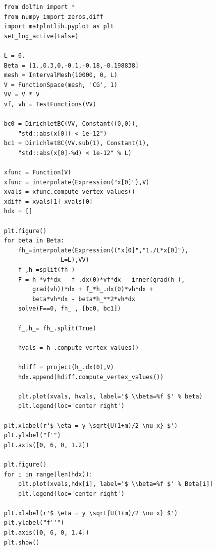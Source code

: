 \documentclass[a4paper,english,11pt,twoside]{article}
\begin{document}
\begin{lstlisting}[style=python]
from dolfin import *
from numpy import zeros,diff
import matplotlib.pyplot as plt
set_log_active(False)

L = 6.
Beta = [1.,0.3,0,-0.1,-0.18,-0.198838]
mesh = IntervalMesh(10000, 0, L)
V = FunctionSpace(mesh, 'CG', 1)
VV = V * V
vf, vh = TestFunctions(VV)

bc0 = DirichletBC(VV, Constant((0,0)), 
	"std::abs(x[0]) < 1e-12")
bc1 = DirichletBC(VV.sub(1), Constant(1), 
	"std::abs(x[0]-%d) < 1e-12" % L)

xfunc = Function(V)
xfunc = interpolate(Expression("x[0]"),V)
xvals = xfunc.compute_vertex_values()
xdiff = xvals[1]-xvals[0]
hdx = []

plt.figure()
for beta in Beta:
	fh_=interpolate(Expression(("x[0]","1./L*x[0]"),
				L=L),VV)
	f_,h_=split(fh_)
	F = h_*vf*dx - f_.dx(0)*vf*dx - inner(grad(h_), 
		grad(vh))*dx + f_*h_.dx(0)*vh*dx + 
		beta*vh*dx - beta*h_**2*vh*dx
	solve(F==0, fh_ , [bc0, bc1])

	f_,h_= fh_.split(True)
	
	hvals = h_.compute_vertex_values()
	
	hdiff = project(h_.dx(0),V)
	hdx.append(hdiff.compute_vertex_values())

	plt.plot(xvals, hvals, label='$ \\beta=%f $' % beta)
	plt.legend(loc='center right')

plt.xlabel(r'$ \eta = y \sqrt{U(1+m)/2 \nu x} $')
plt.ylabel("f'")
plt.axis([0, 6, 0, 1.2])

plt.figure()
for i in range(len(hdx)):
	plt.plot(xvals,hdx[i], label='$ \\beta=%f $' % Beta[i])
	plt.legend(loc='center right')

plt.xlabel(r'$ \eta = y \sqrt{U(1+m)/2 \nu x} $')
plt.ylabel("f''")
plt.axis([0, 6, 0, 1.4])
plt.show()
\end{lstlisting}

\newpage
\end{document}
